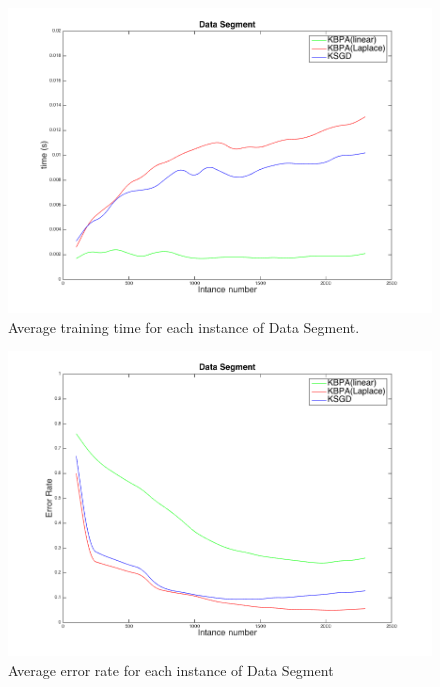\begin{figure}[h!]
\label{pic:SKT}
\centerline{
\includegraphics[scale = 0.4]{fig05/mc/Segment_kernel_T.png}}
\caption{Average training time for each instance of Data Segment.}
\end{figure}

\begin{figure}[h!]
\label{pic:SKM}
\centerline{
\includegraphics[scale = 0.4]{fig05/mc/Segment_kernel_M.png}}
\caption{Average error rate for each instance of Data Segment}
\end{figure}

